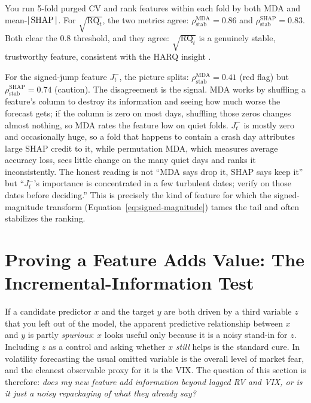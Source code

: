 \begin{workedexample}
You run 5-fold purged CV and rank features within each fold by both MDA and mean-$|\operatorname{SHAP}|$. For $\sqrt{\operatorname{RQ}_t}$, the two metrics agree: $\rho_{\text{stab}}^{\text{MDA}} = 0.86$ and $\rho_{\text{stab}}^{\text{SHAP}} = 0.83$. Both clear the $0.8$ threshold, and they agree: $\sqrt{\operatorname{RQ}_t}$ is a genuinely stable, trustworthy feature, consistent with the HARQ insight \citep{BollerslevPattonQuaedvlieg2016HARQ}.

For the signed-jump feature $J_t^-$, the picture splits: $\rho_{\text{stab}}^{\text{MDA}} = 0.41$ (red flag) but $\rho_{\text{stab}}^{\text{SHAP}} = 0.74$ (caution). The disagreement is the signal. MDA works by shuffling a feature's column to destroy its information and seeing how much worse the forecast gets; if the column is zero on most days, shuffling those zeros changes almost nothing, so MDA rates the feature low on quiet folds. $J_t^-$ is mostly zero and occasionally huge, so a fold that happens to contain a crash day attributes large SHAP credit to it, while permutation MDA, which measures average accuracy loss, sees little change on the many quiet days and ranks it inconsistently. The honest reading is not ``MDA says drop it, SHAP says keep it'' but ``$J_t^-$'s importance is concentrated in a few turbulent dates; verify on those dates before deciding.'' This is precisely the kind of feature for which the signed-magnitude transform (Equation~\ref{eq:signed-magnitude}) tames the tail and often stabilizes the ranking.
\end{workedexample}

\section{Proving a Feature Adds Value: The Incremental-Information Test}\label{sec:feat-incremental}

\begin{prereq}
If a candidate predictor $x$ and the target $y$ are both driven by a third variable $z$ that you left out of the model, the apparent predictive relationship between $x$ and $y$ is partly \emph{spurious}: $x$ looks useful only because it is a noisy stand-in for $z$. Including $z$ as a control and asking whether $x$ \emph{still} helps is the standard cure. In volatility forecasting the usual omitted variable is the overall level of market fear, and the cleanest observable proxy for it is the VIX. The question of this section is therefore: \emph{does my new feature add information beyond lagged RV and VIX, or is it just a noisy repackaging of what they already say?}
\end{prereq}

